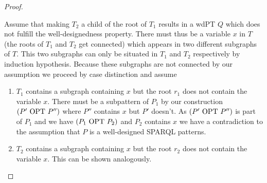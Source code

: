 \begin{proof}
\begin{enumerate}
\begin{enumerate}
					Assume that making $T_2$ a child of the root of $T_1$ 
					results in a wdPT $Q$ which does not fulfill the well-designedness property.
					There must thus be a variable $x$ in $T$ (the roots of $T_1$
					and $T_2$ get connected) which appears in two different subgraphs of $T$. This
					two subgraphs can only be situated in $T_1$ and $T_2$ respectively by induction
					hypothesis.	Because these subgraphs are not connected 
					by our assumption we proceed by	case distinction and assume 
					\begin{enumerate}
						\item $T_1$ contains a subgraph containing $x$ but the root $r_1$ does not
							contain the variable $x$. There must be a subpattern of $P_1$ by our
							construction $(P' \mbox{ OPT } P'')$ where $P''$ contains $x$ but $P'$ doesn't. 
							As $(P' \mbox{ OPT } P'')$ is part of $P_1$ 
							and we have $(P_1 \mbox{ OPT } P_2)$ and $P_2$ contains $x$ we have a
							contradiction to the assumption that $P$ is a well-designed SPARQL
							patterns.
						\item $T_2$ contains a subgraph containing $x$ but the root $r_2$ does not
							contain the variable $x$. This can be shown
							analogously. %
					\end{enumerate}




\end{enumerate}
\end{enumerate}
\end{proof}
